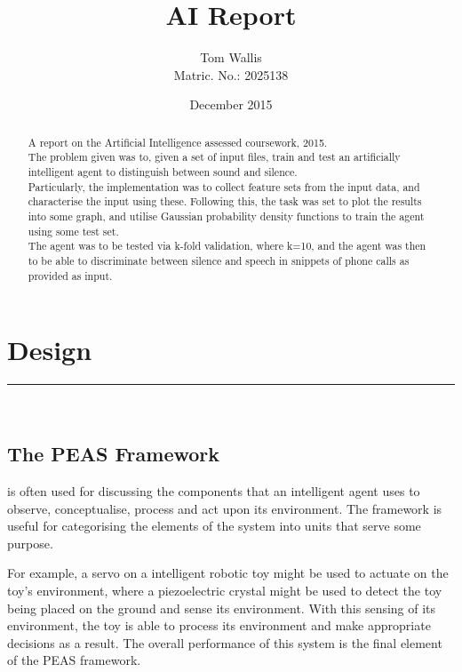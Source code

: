 \documentclass{tufte-handout}
\title{AI Report}
\author{Tom Wallis\\Matric. No.: 2025138}
\date{December 2015}
\begin{document}
\maketitle

\begin{abstract}
A report on the Artificial Intelligence assessed coursework, 2015.\\
The problem given was to, given a set of input files, train and test an artificially intelligent agent to distinguish between sound and silence. \\
Particularly, the implementation was to collect feature sets from the input data, and characterise the input using these. Following this, the task was set to plot the results into some graph, and utilise Gaussian probability density functions to train the agent using some test set.\\
The agent was to be tested via k-fold validation, where k=10, and the agent was then to be able to discriminate between silence and speech in snippets of phone calls as provided as input.\\ 
\end{abstract}


\clearpage
\section{Design}
\noindent\rule{2cm}{0.4pt}\\

\subsection{The PEAS Framework}
 is often used for discussing the components that an intelligent agent uses to observe, conceptualise, process and act upon its environment. The framework is useful for categorising the elements of the system into units that serve some purpose. \par
For example, a servo on a intelligent robotic toy might be used to actuate on the toy's environment, where a piezoelectric crystal might be used to detect the toy being placed on the ground and sense its environment. With this sensing of its environment, the toy is able to process its environment and make appropriate decisions as a result. The overall performance of this system is the final element of the PEAS framework.
\end{document}
